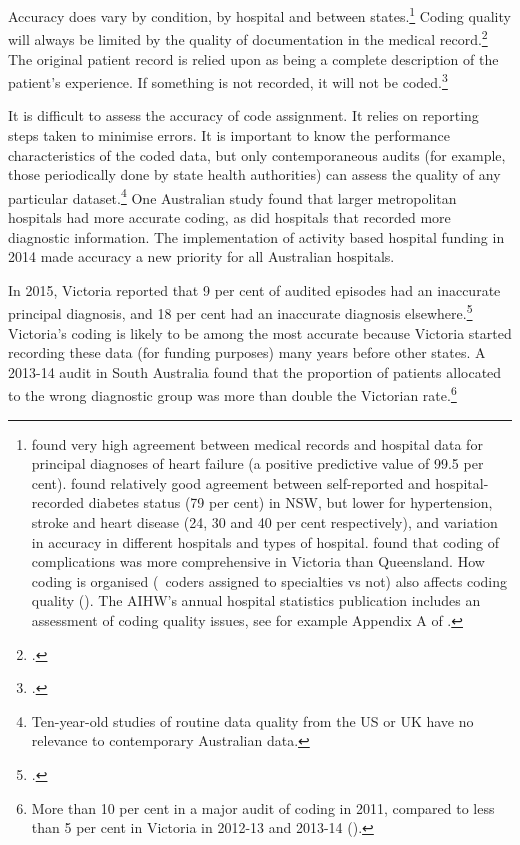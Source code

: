 \documentclass[FrontPage]{grattan}
\begin{document}
Accuracy does vary by condition, by hospital and between states.\footnote{\textcite{RN103} found very high agreement between medical records and hospital data for principal diagnoses of heart failure (a positive predictive value of 99.5 per cent). \textcite{RN104} found relatively good agreement between self-reported and hospital-recorded diabetes status (79 per cent) in NSW, but lower for hypertension, stroke and heart disease (24, 30 and 40 per cent respectively), and variation in accuracy in different hospitals and types of hospital. \textcite{RN105} found that coding of complications was more comprehensive in Victoria than Queensland. How coding is organised (\eg~coders assigned to specialties vs not) also affects coding quality (\textcite{RN106}). The AIHW’s annual hospital statistics publication includes an assessment of coding quality issues, see for example Appendix A of \textcite{RN107}.}
Coding quality will always be limited by the quality of documentation in the medical record.\footcites{RN109}{RN108}
The original patient record is relied upon as being a complete description of the patient’s experience. If something is not recorded, it will not be coded.\footcites{RN112}{RN111}{RN110}

It is difficult to assess the accuracy of code assignment. It relies on reporting steps taken to minimise errors. It is important to know the performance characteristics of the coded data, but only contemporaneous audits (for example, those periodically done by state health authorities) can assess the quality of any particular dataset.\footnote{Ten-year-old studies of routine data quality from the US or UK have no relevance to contemporary Australian data.}
One Australian study found that larger metropolitan hospitals had more accurate coding, as did hospitals that recorded more diagnostic information. The implementation of activity based hospital funding in 2014 made accuracy a new priority for all Australian hospitals.

In 2015, Victoria reported that 9 per cent of audited episodes had an inaccurate principal diagnosis, and 18 per cent had an inaccurate diagnosis elsewhere.\footcite{shepheard2015}
Victoria’s coding is likely to be among the most accurate because Victoria started recording these data (for funding purposes) many years before other states. A 2013-14 audit in South Australia found that the proportion of patients allocated to the wrong diagnostic group was more than double the Victorian rate.\footnote{More than 10 per cent in a major audit of coding in 2011, compared to less than 5 per cent in Victoria in 2012-13 and 2013-14 (\textcite[][224]{AIHW2015hospstats}).}
\end{document}
